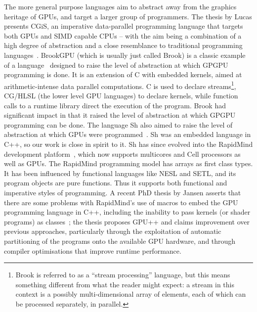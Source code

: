 The more general purpose languages aim to abstract away from the graphics heritage of GPUs, and target a larger group of programmers.
The thesis by Lucas presents CGiS, an imperative data-parallel programming
language that targets both GPUs and SIMD capable CPUs -- with the aim being
a combination of a high degree of abstraction and a close resemblance to traditional programming languages~\cite{Lucas08}.
BrookGPU (which is usually just called Brook) is a classic example of a language~\cite{Brook} designed to raise the level of abstraction at which GPGPU programming is done. It is an extension of C with embedded kernels, aimed at arithmetic-intense data parallel computations. C is used to declare streams\footnote{Brook is referred to as a ``stream processing'' language, but this means something different from what the reader might expect: a stream in this context is
a possibly multi-dimensional array of elements, each of which can be processed separately, in parallel.}, CG/HLSL (the lower level GPU languages) to declare kernels, while
function calls to a runtime library direct the execution of the program.
Brook had significant impact in that it raised the level of abstraction at which GPGPU programming can be done. The language Sh also aimed to raise the level of abstraction at which GPUs were programmed~\cite{Sh}. Sh was an embedded language in C++, so our work is close in spirit to it. Sh has since evolved into the RapidMind development platform~\cite{RapidMind}, which now supports multicores and Cell processors as well as GPUs. 
The RapidMind programming model has arrays as first class types. It
has been influenced by functional languages like NESL and SETL, and its program objects are pure functions. Thus it supports both functional and imperative styles of programming.
A recent PhD thesis by Jansen asserts that there are some problems with RapidMind's use of macros to embed the GPU programming language in C++, including the inability to pass
kernels (or shader programs) as classes~\cite{JansenThesis}; the thesis proposes GPU++ and claims improvement over previous approaches, particularly through the exploitation of automatic partitioning of the programs onto the available GPU hardware, and through compiler optimisations that improve runtime performance.

